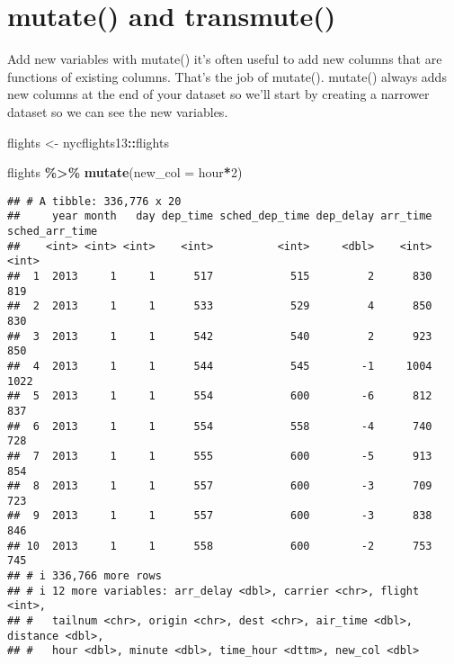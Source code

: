 \documentclass[
]{article}
\newenvironment{Shaded}{\begin{snugshade}}{\end{snugshade}}
\newcommand{\AttributeTok}[1]{\textcolor[rgb]{0.13,0.29,0.53}{#1}}
\newcommand{\DecValTok}[1]{\textcolor[rgb]{0.00,0.00,0.81}{#1}}
\newcommand{\FunctionTok}[1]{\textcolor[rgb]{0.13,0.29,0.53}{\textbf{#1}}}
\newcommand{\NormalTok}[1]{#1}
\newcommand{\OtherTok}[1]{\textcolor[rgb]{0.56,0.35,0.01}{#1}}
\newcommand{\SpecialCharTok}[1]{\textcolor[rgb]{0.81,0.36,0.00}{\textbf{#1}}}
\begin{document}
\hypertarget{mutate-and-transmute}{%
\section{mutate() and transmute()}\label{mutate-and-transmute}}

Add new variables with mutate() it's often useful to add new columns
that are functions of existing columns. That's the job of mutate().
mutate() always adds new columns at the end of your dataset so we'll
start by creating a narrower dataset so we can see the new variables.

\begin{Shaded}
\begin{Highlighting}[]
\NormalTok{flights }\OtherTok{\textless{}{-}}\NormalTok{ nycflights13}\SpecialCharTok{::}\NormalTok{flights}

\NormalTok{flights }\SpecialCharTok{\%\textgreater{}\%} \FunctionTok{mutate}\NormalTok{(}\AttributeTok{new\_col =}\NormalTok{ hour}\SpecialCharTok{*}\DecValTok{2}\NormalTok{) }
\end{Highlighting}
\end{Shaded}

\begin{verbatim}
## # A tibble: 336,776 x 20
##     year month   day dep_time sched_dep_time dep_delay arr_time sched_arr_time
##    <int> <int> <int>    <int>          <int>     <dbl>    <int>          <int>
##  1  2013     1     1      517            515         2      830            819
##  2  2013     1     1      533            529         4      850            830
##  3  2013     1     1      542            540         2      923            850
##  4  2013     1     1      544            545        -1     1004           1022
##  5  2013     1     1      554            600        -6      812            837
##  6  2013     1     1      554            558        -4      740            728
##  7  2013     1     1      555            600        -5      913            854
##  8  2013     1     1      557            600        -3      709            723
##  9  2013     1     1      557            600        -3      838            846
## 10  2013     1     1      558            600        -2      753            745
## # i 336,766 more rows
## # i 12 more variables: arr_delay <dbl>, carrier <chr>, flight <int>,
## #   tailnum <chr>, origin <chr>, dest <chr>, air_time <dbl>, distance <dbl>,
## #   hour <dbl>, minute <dbl>, time_hour <dttm>, new_col <dbl>
\end{verbatim}
\end{document}
